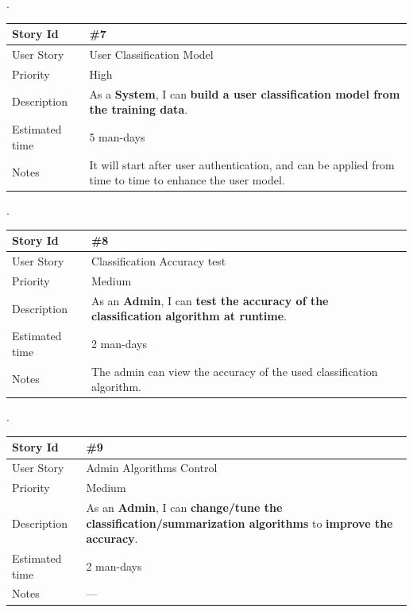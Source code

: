 .\\

\begin{tabular}{|p{3cm}|p{10cm}|}
\hline
\cellcolor[gray]{0.9} Story Id & \#7 \\ \hline
\cellcolor[gray]{0.9} User Story & User Classification Model \\ \hline
\cellcolor[gray]{0.9} Priority & High\\ \hline
\cellcolor[gray]{0.9} Description & 
	As a \textbf{System}, I can \textbf{build a user classification 
	model from the training data}. \\ \hline
\cellcolor[gray]{0.9} Estimated time & 5 man-days\\ \hline
\cellcolor[gray]{0.9} Notes & 
	It will start after user authentication, and can be applied 
	from time to time to enhance the user model. \\ \hline
\end{tabular}

.\\

\begin{tabular}{|p{3cm}|p{10cm}|}
\hline
\cellcolor[gray]{0.9} Story Id & \#8 \\ \hline
\cellcolor[gray]{0.9} User Story & Classification Accuracy test \\ \hline
\cellcolor[gray]{0.9} Priority & Medium \\ \hline
\cellcolor[gray]{0.9} Description & 
	As an \textbf{Admin}, I can \textbf{test the accuracy of the 
	classification algorithm at runtime}. \\ \hline
\cellcolor[gray]{0.9} Estimated time & 2 man-days\\ \hline
\cellcolor[gray]{0.9} Notes & 
	The admin can view the accuracy of the used classification algorithm. \\ \hline
\end{tabular}

.\\

\begin{tabular}{|p{3cm}|p{10cm}|}
\hline
\cellcolor[gray]{0.9} Story Id & \#9 \\ \hline
\cellcolor[gray]{0.9} User Story & Admin Algorithms Control \\ \hline
\cellcolor[gray]{0.9} Priority & Medium \\ \hline
\cellcolor[gray]{0.9} Description & 
	As an \textbf{Admin}, I can \textbf{change/tune the 
	classification/summarization algorithms} to
	\textbf{improve the accuracy}. \\ \hline
\cellcolor[gray]{0.9} Estimated time & 2 man-days\\ \hline
\cellcolor[gray]{0.9} Notes & --- \\ \hline
\end{tabular}

